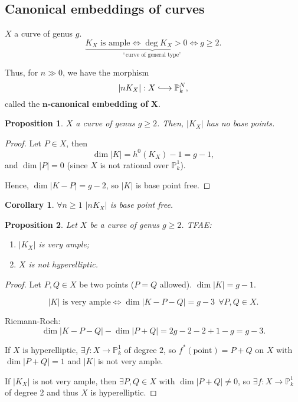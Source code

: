 \documentclass[12pt]{article}
\newtheorem*{proposition}{Proposition}
\newtheorem*{corollary}{Corollary}
\theoremstyle{definition}
\begin{document}
\subsection*{Canonical embeddings of curves}
$X$ a curve of genus $g$.
\[\underbrace{K_X\text{ is ample}\Longleftrightarrow\deg K_X>0\Longleftrightarrow g\geq2}_{\text{``curve of general type''}}.\]

Thus, for $n\gg0$, we have the morphism
\[|nK_X|:X\lhook\joinrel\longrightarrow\mathbb{P}_k^N,\]
called the $\boldsymbol{n}$\textbf{-canonical embedding of }$\boldsymbol{X}$.

\begin{proposition}
$X$ a curve of genus $g\geq2$. Then, $|K_X|$ has no base points.
\end{proposition}

\begin{proof}
Let $P\in X$, then
\[\dim|K|=h^0(K_X)-1=g-1,\]
and $\dim|P|=0$ (since $X$ is not rational over $\mathbb{P}_k^1$).

Hence, $\dim|K-P|=g-2$, so $|K|$ is base point free.
\end{proof}

\begin{corollary}
$\forall n\geq1$ $|nK_X|$ is base point free.
\end{corollary}

\begin{proposition}
Let $X$ be a curve of genus $g\geq2$. TFAE:
\begin{enumerate}[label=\arabic*)]
\item $|K_X|$ is very ample;
\item $X$ is not hyperelliptic.
\end{enumerate}
\end{proposition}

\begin{proof}
Let $P,Q\in X$ be two points ($P=Q$ allowed). $\dim|K|=g-1$.

\[|K|\text{ is very ample}\Longleftrightarrow\dim|K-P-Q|=g-3\ \ \forall P,Q\in X.\]

Riemann-Roch:
\[\dim|K-P-Q|-\dim|P+Q|=2g-2-2+1-g=g-3.\]

If $X$ is hyperelliptic, $\exists f:X\rightarrow\mathbb{P}_k^1$ of degree $2$, so $f^*(\text{point})=P+Q$ on $X$ with $\dim|P+Q|=1$ and $|K|$ is not very ample.

If $|K_X|$ is not very ample, then $\exists P,Q\in X$ with $\dim|P+Q|\neq0$, so $\exists f:X\rightarrow\mathbb{P}_k^1$ of degree 2 and thus $X$ is hyperelliptic.
\end{proof}
\end{document}
